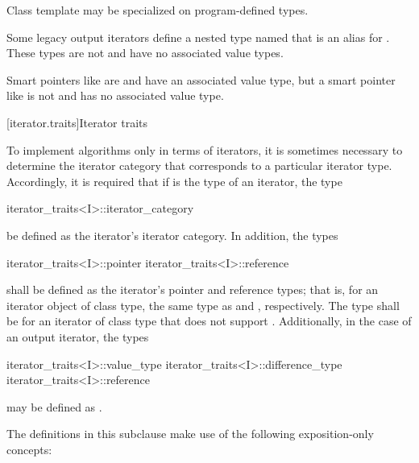 \pnum
Class template  may be specialized
on program-defined types.

\pnum
\begin{note}
Some legacy output iterators define a nested type named 
that is an alias for .
These types are not 
and have no associated value types.
\end{note}

\pnum
\begin{note}
Smart pointers like  are  and
have an associated value type, but a smart pointer like 
is not  and has no associated value type.
\end{note}

[iterator.traits]{Iterator traits}

\pnum
{}%
To implement algorithms only in terms of iterators, it is sometimes necessary to
determine the iterator category that corresponds to a particular iterator type.
Accordingly, it is required that if
is the type of an iterator,
the type
%
\begin{codeblock}
iterator_traits<I>::iterator_category
\end{codeblock}
be defined as the iterator's iterator category.
In addition, the types
%
%
\begin{codeblock}
iterator_traits<I>::pointer
iterator_traits<I>::reference
\end{codeblock}
shall be defined as the iterator's pointer and reference types;
that is, for an
iterator object  of class type,
the same type as
 and
,
respectively.
The type
shall be 
for an iterator of class type 
that does not support .
Additionally, in the case of an output iterator, the types
\begin{codeblock}
iterator_traits<I>::value_type
iterator_traits<I>::difference_type
iterator_traits<I>::reference
\end{codeblock}
may be defined as .

\pnum
The definitions in this subclause make use of the following
exposition-only concepts:

